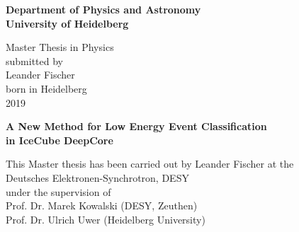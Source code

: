 

\thispagestyle{plain}
    \begin{center}
        \vspace{2cm}
        \huge\textbf{Department of Physics and Astronomy\\}
        \vspace{1cm}
        \LARGE\textbf{University of Heidelberg}

        \vspace{15cm}

        \renewcommand{\baselinestretch}{2.00}

        \large
        Master Thesis in Physics\\
        submitted by\\
        {Leander Fischer}\\
        born in Heidelberg\\
        {2019}

        \renewcommand{\baselinestretch}{1.00}\normalsize

        \vfill
    \end{center}

\cleardoublepage

\thispagestyle{plain}
    \begin{center}
        \vspace{1cm}
        \LARGE\textbf{A New Method for Low Energy Event Classification}\\
        \vspace{0.5cm}
        \LARGE\textbf{in IceCube DeepCore}\\

        \vspace{15cm}

        \renewcommand{\baselinestretch}{2.00}

        \large
        This Master thesis has been carried out by Leander Fischer at the\\
        Deutsches Elektronen-Synchrotron, DESY\\
        under the supervision of\\
        Prof. Dr. Marek Kowalski (DESY, Zeuthen)\\
        Prof. Dr. Ulrich Uwer (Heidelberg University)

        \renewcommand{\baselinestretch}{1.00}\normalsize

        \vfill
    \end{center}

\cleardoublepage
